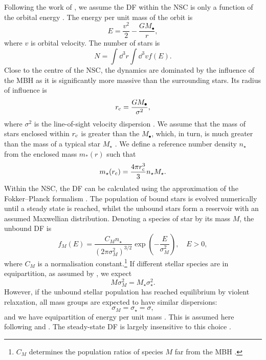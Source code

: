 Following the work of \citet{Bahcall1976, Bahcall1977}, we assume the DF within the NSC is only a function of the orbital energy \citep{Shapiro1978}. The energy per unit mass of the orbit is
\begin{equation}
E = \dfrac{v^2}{2} - \dfrac{GM_\bullet}{r},
\end{equation}
where $v$ is orbital velocity. The number of stars is
\begin{equation}
N = \int \dd^3r \int \dd^3v f(E).
\end{equation}
Close to the centre of the NSC, the dynamics are dominated by the influence of the MBH as it is significantly more massive than the surrounding stars. Its radius of influence is
\begin{equation}
r_\mathrm{c} = \dfrac{GM_\bullet}{\sigma^2},
\label{eq:r_c}
\end{equation}
where $\sigma^2$ is the line-of-sight velocity dispersion \citep{Frank1976}. We assume that the mass of stars enclosed within $r_\mathrm{c}$ is greater than the $M_\bullet$, which, in turn, is much greater than the mass of a typical star $M_\star$ \citep{Bahcall1976}. We define a reference number density $n_\star$ from the enclosed mass $m_\ast(r)$ such that
\begin{equation}
m_\star(r_\mathrm{c}) = \dfrac{4\pi r_\mathrm{c}^3}{3}n_\star M_\star.
\end{equation}
Within the NSC, the DF can be calculated using the approximation of the Fokker--Planck formalism \citep[section 7.4]{Binney2008}. The population of bound stars is evolved numerically until a steady state is reached, whilst the unbound stars form a reservoir with an assumed Maxwellian distribution. Denoting a species of star by its mass $M$, the unbound DF is
\begin{equation}
f_M(E) = \dfrac{C_M n_\star}{(2\pi\sigma_M^2)^{3/2}} \exp\left(-\dfrac{E}{\sigma_M^2}\right),\quad E > 0,
\label{eq:Unbound_DF}
\end{equation}
where $C_M$ is a normalisation constant.\footnote{$C_M$ determines the population ratios of species $M$ far from the MBH \citep{Alexander2009}.} If different stellar species are in equipartition, as assumed by \citet{Bahcall1976, Bahcall1977}, we expect
\begin{equation}
M \sigma_M^2 = M_\star \sigma_\star^2.
\end{equation}
However, if the unbound stellar population has reached equilibrium by violent relaxation, all mass groups are expected to have similar dispersions:
\begin{equation}
\sigma_M = \sigma_\star = \sigma,
\end{equation}
and we have equipartition of energy per unit mass \citep{Lynden-Bell1967}. This is assumed here following \citet{Alexander2009} and \citet{O'Leary2009}. The steady-state DF is largely insensitive to this choice \citep{Bahcall1977, Alexander2009}.

